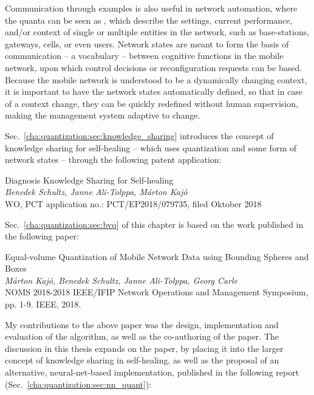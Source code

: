 	Communication through examples is also useful in network automation, where the quanta can be seen as , which describe the settings, current performance, and/or context of single or multiple entities in the network, such as base-stations, gateways, cells, or even users.
	Network states are meant to form the basis of communication -- a vocabulary -- between cognitive functions in the mobile network, upon which control decisions or reconfiguration requests can be based.
	Because the mobile network is understood to be a dynamically changing context, it is important to have the network states automatically defined, so that in case of a context change, they can be quickly redefined without human supervision, making the management system adaptive to change.
	
	Sec.~\ref{cha:quantization:sec:knowledge_sharing} introduces the concept of knowledge sharing for self-healing -- which uses quantization and some form of network states -- through the following patent application:
	
	\begin{patent}
		Diagnosis Knowledge Sharing for Self-healing \\
		\textit{Benedek Schultz, Janne Ali-Tolppa, Márton Kajó} \\
		WO, PCT application no.: PCT/EP2018/079735, filed Oktober 2018
	\end{patent}

	Sec.~\ref{cha:quantization:sec:bvq} of this chapter is based on the work published in the following paper:
	
	\begin{publication}
		Equal-volume Quantization of Mobile Network Data using Bounding Spheres and Boxes \\
		\textit{Márton Kajó, Benedek Schultz, Janne Ali-Tolppa, Georg Carle} \\
		NOMS 2018-2018 IEEE/IFIP Network Operations and Management Symposium, pp. 1-9. IEEE, 2018.
	\end{publication}
	
	My contributions to the above paper was the design, implementation and evaluation of the algorithm, as well as the co-authoring of the paper.
	The discussion in this thesis expands on the paper, by placing it into the larger concept of knowledge sharing in self-healing, as well as the proposal of an alternative, neural-net-based implementation, published in the following report (Sec.~\ref{cha:quantization:sec:nn_quant}):
	
